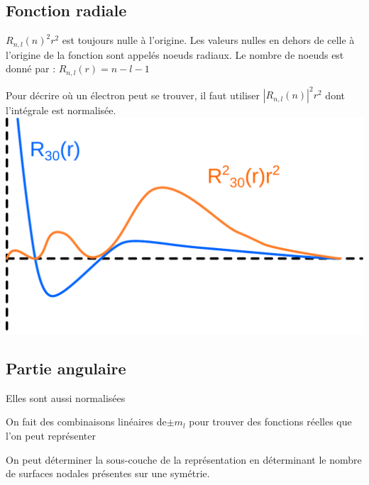 \documentclass[french]{yLectureNote}
\begin{document}
\subsection{Fonction radiale}
$R_{n,l}(n)^2 r^2$ est toujours nulle à l'origine. Les valeurs nulles en dehors de celle à l'origine de la fonction sont appelés noeuds radiaux. Le nombre de noeuds est donné par : $R_{n,l}(r) = n-l-1$

Pour décrire où un électron peut se trouver, il faut utiliser $|R_{n,l}(n)|^2 r^2$ dont l'intégrale est normalisée.
\includegraphics[scale=0.5]{OA-rad}
\subsection{Partie angulaire}
Elles sont aussi normalisées

On fait des combinaisons linéaires de$\pm m_l$ pour trouver des fonctions réelles que l'on peut représenter



On peut déterminer la sous-couche de la représentation en déterminant le nombre de surfaces nodales présentes sur une symétrie. 
\end{document}
